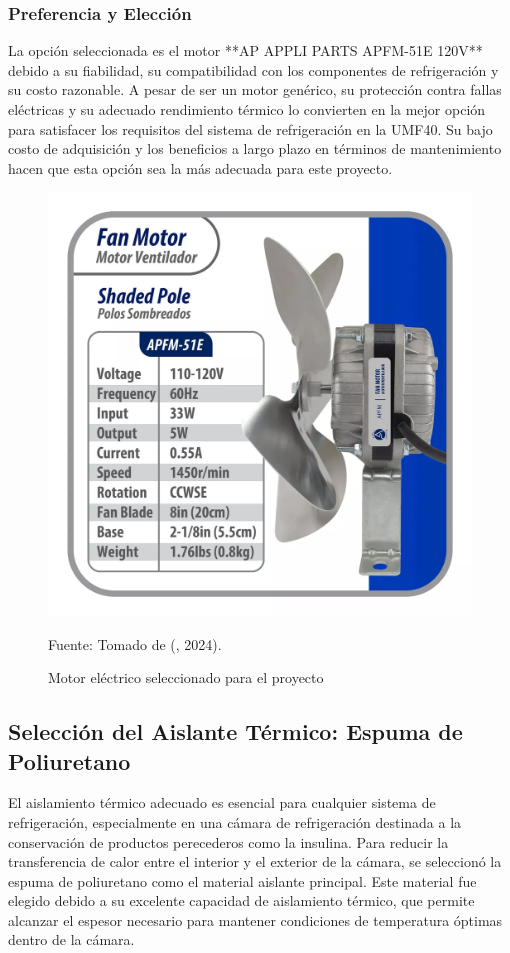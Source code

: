 \subsubsection{Preferencia y Elección}
La opción seleccionada es el motor **AP APPLI PARTS APFM-51E 120V** debido a su fiabilidad, su compatibilidad con los componentes de refrigeración y su costo razonable. A pesar de ser un motor genérico, su protección contra fallas eléctricas y su adecuado rendimiento térmico lo convierten en la mejor opción para satisfacer los requisitos del sistema de refrigeración en la UMF40. Su bajo costo de adquisición y los beneficios a largo plazo en términos de mantenimiento hacen que esta opción sea la más adecuada para este proyecto.
  
 
  
  \begin{figure}[H]
  	\centering
  	\includegraphics[width=0.5\linewidth]{figures/motorelectrico}
 	\caption{Motor eléctrico seleccionado para el proyecto}
Fuente: Tomado de (\citeauthor{ml2024}, 2024).
  	\label{fig:motorelectrico}
  \end{figure}
  
  
  \subsection{Selección del Aislante Térmico: Espuma de Poliuretano}
  
  El aislamiento térmico adecuado es esencial para cualquier sistema de refrigeración, especialmente en una cámara de refrigeración destinada a la conservación de productos perecederos como la insulina. Para reducir la transferencia de calor entre el interior y el exterior de la cámara, se seleccionó la espuma de poliuretano como el material aislante principal. Este material fue elegido debido a su excelente capacidad de aislamiento térmico, que permite alcanzar el espesor necesario para mantener condiciones de temperatura óptimas dentro de la cámara.
  
